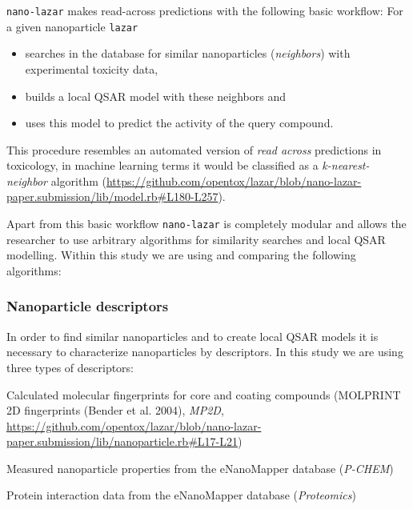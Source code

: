 \documentclass[utf8]{frontiersHLTH} %
\makeatletter
\providecommand{\tightlist}{%
  \setlength{\itemsep}{0pt}\setlength{\parskip}{0pt}}
\newenvironment{description}
	{\list{}{\labelwidth\z@ \itemindent-\leftmargin
		\let\makelabel\descriptionlabel}}
	{\endlist}
\newcommand*\descriptionlabel[1]{\hspace\labelsep
	\normalfont\bfseries #1}
\makeatother
\begin{document}
\texttt{nano-lazar} makes read-across predictions with the following
basic workflow: For a given nanoparticle \texttt{lazar}

\begin{itemize}
\tightlist
\item
  searches in the database for similar nanoparticles (\emph{neighbors})
  with experimental toxicity data,
\item
  builds a local QSAR model with these neighbors and
\item
  uses this model to predict the activity of the query compound.
\end{itemize}

This procedure resembles an automated version of \emph{read across}
predictions in toxicology, in machine learning terms it would be
classified as a \emph{k-nearest-neighbor} algorithm
(\url{https://github.com/opentox/lazar/blob/nano-lazar-paper.submission/lib/model.rb\#L180-L257}).

Apart from this basic workflow \texttt{nano-lazar} is completely modular
and allows the researcher to use arbitrary algorithms for similarity
searches and local QSAR modelling. Within this study we are using and
comparing the following algorithms:

\subsubsection{Nanoparticle descriptors}\label{nanoparticle-descriptors}

In order to find similar nanoparticles and to create local QSAR models
it is necessary to characterize nanoparticles by descriptors. In this
study we are using three types of descriptors:

\begin{description}
\tightlist
\item[Structural descriptors]
Calculated molecular fingerprints for core and coating compounds
(MOLPRINT 2D fingerprints (Bender et al. 2004), \emph{MP2D},
\url{https://github.com/opentox/lazar/blob/nano-lazar-paper.submission/lib/nanoparticle.rb\#L17-L21})
\item[Physico-chemical nanoparticle properties]
Measured nanoparticle properties from the eNanoMapper database
(\emph{P-CHEM})
\item[Biological nanoparticle properties]
Protein interaction data from the eNanoMapper database
(\emph{Proteomics})
\end{description}
\end{document}
